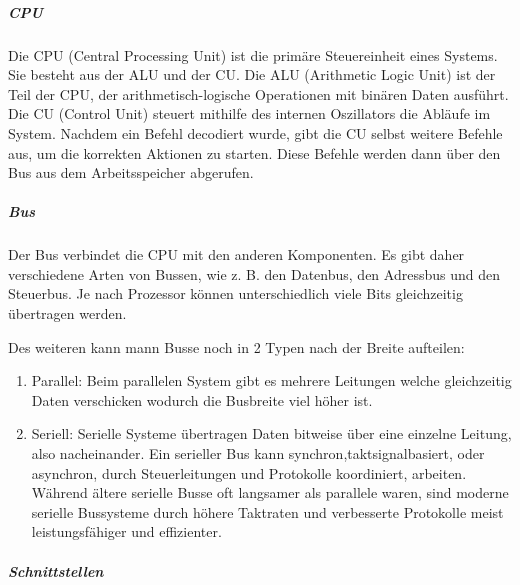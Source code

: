 \documentclass[
    headings=optiontotocandhead,%
    twoside,
    numbers=noenddot,%
    12pt, %
    titlepage, %
    parskip=full, %
    listof=leveldown, 
    numbers=noenddot, %
    a4paper,DIV=14,
    BCOR=15mm,
]{scrbook}
\providecommand{\tightlist}{%
  \setlength{\itemsep}{0pt}\setlength{\parskip}{0pt}}
\begin{document}
\hypertarget{cpu}{%
\subparagraph{CPU}\label{cpu}}

Die CPU (Central Processing Unit) ist die primäre Steuereinheit eines
Systems. Sie besteht aus der ALU und der CU. Die ALU (Arithmetic Logic
Unit) ist der Teil der CPU, der arithmetisch-logische Operationen mit
binären Daten ausführt. Die CU (Control Unit) steuert mithilfe des
internen Oszillators die Abläufe im System. Nachdem ein Befehl decodiert
wurde, gibt die CU selbst weitere Befehle aus, um die korrekten Aktionen
zu starten. Diese Befehle werden dann über den Bus aus dem
Arbeitsspeicher abgerufen.

\hypertarget{bus}{%
\subparagraph{Bus}\label{bus}}

Der Bus verbindet die CPU mit den anderen Komponenten. Es gibt daher
verschiedene Arten von Bussen, wie z. B. den Datenbus, den Adressbus und
den Steuerbus. Je nach Prozessor können unterschiedlich viele Bits
gleichzeitig übertragen werden.

Des weiteren kann mann Busse noch in 2 Typen nach der Breite aufteilen:

\begin{enumerate}
\def\labelenumi{\arabic{enumi}.}
\tightlist
\item
  Parallel: Beim parallelen System gibt es mehrere Leitungen welche
  gleichzeitig Daten verschicken wodurch die Busbreite viel höher ist.
\item
  Seriell: Serielle Systeme übertragen Daten bitweise über eine einzelne
  Leitung, also nacheinander. Ein serieller Bus kann
  synchron,taktsignalbasiert, oder asynchron, durch Steuerleitungen und
  Protokolle koordiniert, arbeiten. Während ältere serielle Busse oft
  langsamer als parallele waren, sind moderne serielle Bussysteme durch
  höhere Taktraten und verbesserte Protokolle meist leistungsfähiger und
  effizienter.
\end{enumerate}

\hypertarget{schnittstellen}{%
\subparagraph{Schnittstellen}\label{schnittstellen}}
\end{document}
